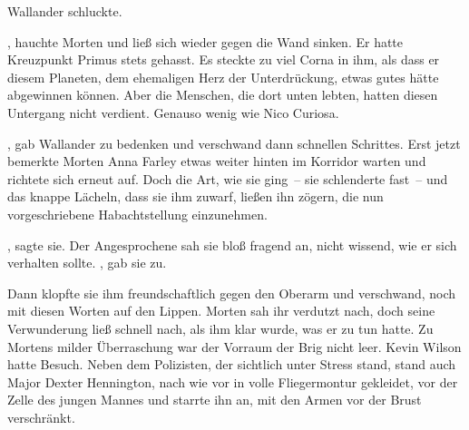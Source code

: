 \par

Wallander schluckte. 

\par

, hauchte Morten und ließ sich wieder gegen die Wand sinken. Er hatte Kreuzpunkt Primus stets gehasst. Es steckte zu viel Corna in ihm, als dass er diesem Planeten, dem ehemaligen Herz der Unterdrückung, etwas gutes hätte abgewinnen können. Aber die Menschen, die dort unten lebten, hatten diesen Untergang nicht verdient. Genauso wenig wie Nico Curiosa.

\par

, gab Wallander zu bedenken und verschwand dann schnellen Schrittes. Erst jetzt bemerkte Morten Anna Farley etwas weiter hinten im Korridor warten und richtete sich erneut auf. Doch die Art, wie sie ging~-- sie schlenderte fast~-- und das knappe Lächeln, dass sie ihm zuwarf, ließen ihn zögern, die nun vorgeschriebene Habachtstellung einzunehmen.

\par

, sagte sie.  Der Angesprochene sah sie bloß fragend an, nicht wissend, wie er sich verhalten sollte. , gab sie zu. 

\par

Dann klopfte sie ihm freundschaftlich gegen den Oberarm und verschwand, noch mit diesen Worten auf den Lippen. Morten sah ihr verdutzt nach, doch seine Verwunderung ließ schnell nach, als ihm klar wurde, was er zu tun hatte.
\ortswechsel
Zu Mortens milder Überraschung war der Vorraum der Brig nicht leer. Kevin Wilson hatte Besuch. Neben dem Polizisten, der sichtlich unter Stress stand, stand auch Major Dexter Hennington, nach wie vor in volle Fliegermontur gekleidet, vor der Zelle des jungen Mannes und starrte ihn an, mit den Armen vor der Brust verschränkt.

